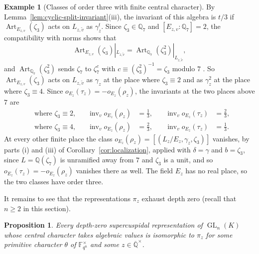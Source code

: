\documentclass[a4paper,11pt]{amsart}
\newtheorem{proposition}[theorem]{Proposition}
\theoremstyle{definition}
\newtheorem{example}[theorem]{Example}
\theoremstyle{remark}
\numberwithin{equation}{section}
\newcommand{\Q}{\mathbb{Q}}
\DeclareMathOperator{\inv}{inv}
\DeclareMathOperator{\GL}{GL}
\newcommand{\F}{\mathbb{F}}
\newcommand{\Qbar}{\overline{\mathbb{Q}}}
\DeclareMathOperator{\Art}{Art}
\begin{document}
\begin{example}[Classes of order three with finite central character]
By Lemma~\ref{lem:cyclic-split-invariant}(iii), the invariant of this algebra is $t/3$ if $\Art_{E_{z,v}}(\zeta_3)$ acts on $L_{z,\tilde v}$ as $\gamma_z^t$. Since $\zeta_3\in\Q_7$ and $[E_{z,v}:\Q_7]=2$, the compatibility with norms \cite[III, Lemma~3.2]{Mil20} shows that
\[
 \Art_{E_{z,v}}(\zeta_3)|_{L_{z,\tilde v}}=\Art_{\Q_7}(\zeta_3^2)|_{L_{z,\tilde v}},
\]
and $\Art_{\Q_7}(\zeta_3^2)$ sends $\zeta_7$ to $\zeta_7^c$ with $c\equiv(\zeta_3^2)^{-1}=\zeta_3$ modulo $7$ \cite[I, Example~3.13]{Mil20}. So $\Art_{E_{z,v}}(\zeta_3)$ acts on $L_{z,\tilde v}$ as $\gamma_z$ at the place where $\zeta_3\equiv2$ and as $\gamma_z^2$ at the place where $\zeta_3\equiv4$. Since $o_{E_z}(\tau_z)=-o_{E_z}(\rho_z)$, the invariants at the two places above $7$ are
\[
\begin{aligned}
 &\text{where }\zeta_3\equiv2\text{,} &\quad \inv_v o_{E_z}(\rho_z)&=\tfrac13,
 &\quad \inv_v o_{E_z}(\tau_z)&=\tfrac23,\\
 &\text{where }\zeta_3\equiv4\text{,} &\quad \inv_v o_{E_z}(\rho_z)&=\tfrac23,
 &\quad \inv_v o_{E_z}(\tau_z)&=\tfrac13.
\end{aligned}
\]
At every other finite place the class $o_{E_z}(\rho_z)=[(L_z/E_z,\gamma_z,\zeta_3)]$ vanishes, by parts (i) and (iii) of Corollary~\ref{cor:localization}, applied with $\delta=\gamma$ and $b=\zeta_3$, since $L=\Q(\zeta_7)$ is unramified away from $7$ and $\zeta_3$ is a unit, and so $o_{E_z}(\tau_z)=-o_{E_z}(\rho_z)$ vanishes there as well. The field $E_z$ has no real place, so the two classes have order three.
\end{example}

It remains to see that the representations $\pi_z$ exhaust depth zero (recall that $n\ge2$ in this section).

\begin{proposition}\label{prop:depth-zero-exhaustion}
Every depth-zero supercuspidal representation of $\GL_n(K)$ whose central character takes algebraic values is isomorphic to $\pi_z$ for some primitive character $\theta$ of $\F_{q^n}^\times$ and some $z\in\Qbar^\times$.
\end{proposition}
\end{document}
